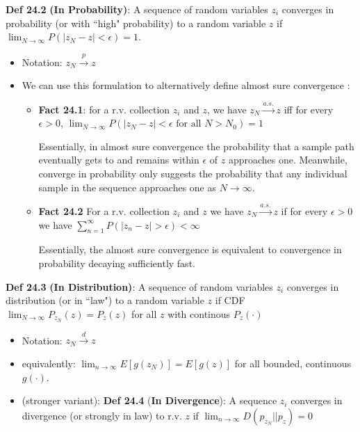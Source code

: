 \documentclass[12pt]{article} %
\begin{document}
\textbf{Def 24.2} \textbf{(In Probability)}: A sequence of random variables $z_i$ converges in probability (or with ``high" probability) to a random variable $z$ if $\lim_{N \rightarrow \infty}P(|z_N - z| < \epsilon) = 1$.
\begin{itemize}[topsep=-1pt, itemsep=-1pt]
    \item 
Notation: $z_N \xrightarrow{p} z$
    \item 
We can use this formulation to alternatively define almost sure convergence :
\begin{itemize}[topsep=-1pt, itemsep=-1pt]
    \item 
\textbf{Fact 24.1}: for a r.v. collection $z_i$ and $z$, we have $z_N \xrightarrow{a.s.} z$ iff for every $\epsilon > 0$, $\lim_{N \rightarrow \infty} P(|z_N - z| < \epsilon \text{ for all } N > N_0) = 1$

Essentially, in almost sure convergence the probability that a sample path eventually gets to and remains within $\epsilon$ of $z$ approaches one. Meanwhile, converge in probability only suggests the probability that any individual sample in the sequence approaches one as $N \rightarrow \infty$.
    \item 
\textbf{Fact 24.2} For a r.v. collection $z_i$ and $z$ we have $z_N \xrightarrow{a.s.} z$ if for every $\epsilon > 0$ we have $\sum_{n = 1}^{\infty} P(|z_n - z| > \epsilon) < \infty$

Essentially, the almost sure convergence is equivalent to convergence in probability decaying sufficiently fast.
\end{itemize}
\end{itemize}

\textbf{Def 24.3} \textbf{(In Distribution)}: A sequence of random variables $z_i$ converges in distribution (or in ``law") to a random variable $z$ if CDF $\lim_{N \rightarrow \infty}P_{z_N}(z) = P_z(z)$ for all $z$ with continous $P_z(\cdot)$
\begin{itemize}[topsep=-1pt, itemsep=-1pt]
    \item 
Notation: $z_N \xrightarrow{d} z$
    \item equivalently: $\lim_{n \rightarrow \infty} E[g(z_N)] = E[g(z)]$ for all bounded, continuous $g(\cdot)$.
    \item 
(stronger variant): \textbf{Def 24.4} (\textbf{In Divergence}): A sequence $z_i$ converges in divergence (or strongly in law) to r.v. $z$ if $\lim_{n \rightarrow \infty}D(p_{z_N}||p_z) = 0$
\end{itemize}
\end{document}
